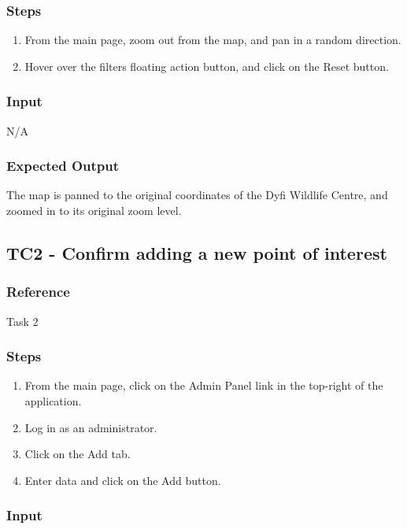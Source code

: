 \subsubsection{Steps}

\begin{enumerate}
	\item From the main page, zoom out from the map, and pan in a random direction.
	\item Hover over the filters floating action button, and click on the Reset button.
\end{enumerate}

\subsubsection{Input}

N/A

\subsubsection{Expected Output}

The map is panned to the original coordinates of the Dyfi Wildlife Centre, and zoomed in to its original zoom level.

\subsection{TC2 - Confirm adding a new point of interest}

\subsubsection{Reference}

Task 2

\subsubsection{Steps}

\begin{enumerate}
	\item From the main page, click on the Admin Panel link in the top-right of the application.
	\item Log in as an administrator.
	\item Click on the Add tab.
	\item Enter data and click on the Add button.
\end{enumerate}

\subsubsection{Input}

